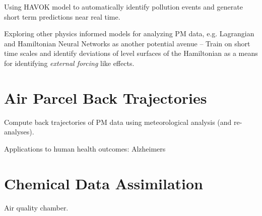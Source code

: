 Using HAVOK model to automatically identify pollution events and generate short term predictions near real time.

Exploring other physics informed models for analyzing PM data, e.g. Lagrangian
and Hamiltonian Neural Networks as another potential avenue -- Train on short
time scales and identify deviations of level surfaces of the Hamiltonian as a
means for identifying \textit{external forcing} like effects.

\section{Air Parcel Back Trajectories}

Compute back trajectories of PM data using meteorological analysis (and re-analyses).

Applications to human health outcomes: Alzheimers


\section{Chemical Data Assimilation}

Air quality chamber.





